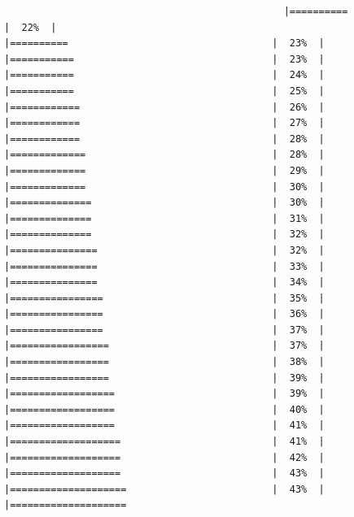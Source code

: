 \documentclass[
  krantz2]{krantz}
\begin{document}
\begin{verbatim}
                                                |==========                                   |  22%  |                                                     |==========                                   |  23%  |                                                     |===========                                  |  23%  |                                                     |===========                                  |  24%  |                                                     |===========                                  |  25%  |                                                     |============                                 |  26%  |                                                     |============                                 |  27%  |                                                     |============                                 |  28%  |                                                     |=============                                |  28%  |                                                     |=============                                |  29%  |                                                     |=============                                |  30%  |                                                     |==============                               |  30%  |                                                     |==============                               |  31%  |                                                     |==============                               |  32%  |                                                     |===============                              |  32%  |                                                     |===============                              |  33%  |                                                     |===============                              |  34%  |                                                     |================                             |  35%  |                                                     |================                             |  36%  |                                                     |================                             |  37%  |                                                     |=================                            |  37%  |                                                     |=================                            |  38%  |                                                     |=================                            |  39%  |                                                     |==================                           |  39%  |                                                     |==================                           |  40%  |                                                     |==================                           |  41%  |                                                     |===================                          |  41%  |                                                     |===================                          |  42%  |                                                     |===================                          |  43%  |                                                     |====================                         |  43%  |                                                     |====================          
\end{verbatim}
\end{document}

